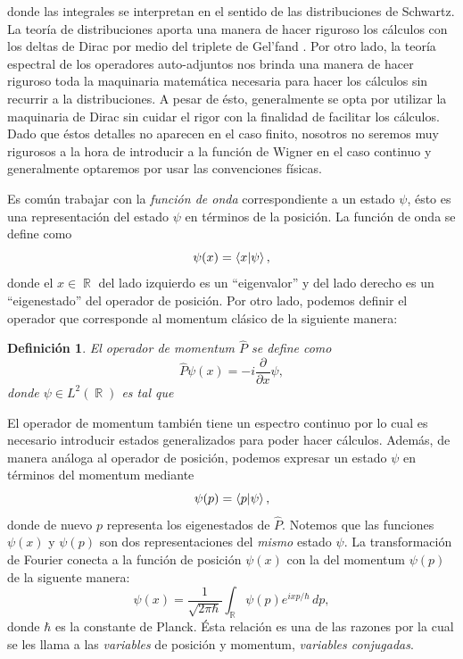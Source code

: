 \documentclass[a4paper,11pt]{report}
\DeclareMathOperator{\R}{\mathbb{R}}
\newtheorem{definition}{Definición}
\begin{document}
  donde las integrales se interpretan en el sentido de las
  distribuciones de Schwartz. La teoría de distribuciones
  aporta una manera de hacer riguroso los cálculos con los
  deltas de Dirac por medio del triplete de Gel'fand
  \cite{folland1989}. Por otro lado, la teoría espectral de
  los operadores auto-adjuntos nos brinda una manera de
  hacer riguroso toda la maquinaria matemática necesaria
  para hacer los cálculos sin recurrir a la distribuciones.
  A pesar de ésto, generalmente se opta por utilizar la
  maquinaria de Dirac sin cuidar el rigor con la finalidad
  de facilitar los cálculos. Dado que éstos detalles no
  aparecen en el caso finito, nosotros no seremos muy
  rigurosos a la hora de introducir a la función de Wigner
  en el caso continuo y generalmente optaremos por usar las
  convenciones físicas.

  Es común trabajar con la \textit{función de onda}
  correspondiente a un estado $\psi$, ésto es una
  representación del estado $\psi$ en términos de la
  posición. La función de onda se define como
  \begin{equation}
    \psi(x)
    = \braket{x| \psi},
  \end{equation} 
  donde el $x \in \R$ del lado izquierdo es un
  ``eigenvalor'' y del lado derecho es un ``eigenestado''
  del operador de posición. Por otro lado, podemos definir
  el operador que corresponde al momentum clásico de la
  siguiente manera:
  \begin{definition}
    El operador de momentum $\hat P$ se define como
    \[
      \hat P\psi(x) = -i \frac{\partial}{\partial x} \psi,
    \] 
    donde $\psi \in L^2(\R)$ es tal que
  \end{definition}
  El operador de momentum también tiene un espectro continuo
  por lo cual es necesario introducir estados generalizados
  para poder hacer cálculos. Además, de manera análoga al
  operador de posición, podemos expresar un estado $\psi$ en
  términos del momentum mediante
  \begin{equation}
    \psi(p)
    = \braket{p| \psi},
  \end{equation} 
  donde de nuevo $p$ representa los eigenestados de $\hat
  P$. Notemos que las funciones $\psi(x)$ y $\psi(p)$ son
  dos representaciones del \textit{mismo} estado $\psi$.  La
  transformación de Fourier conecta a la función de posición
  $\psi(x)$ con la del momentum $\psi(p)$ de la siguente
  manera:
  \begin{equation}
    \psi(x)
    = \frac{1}{\sqrt{2\pi\hbar}} \int_{\R} \psi(p)e^{ixp /
    \hbar} \, dp,
  \end{equation} 
  donde $\hbar$ es la constante de Planck. Ésta relación es
  una de las razones por la cual se les llama a las
  \textit{variables} de posición y momentum,
  \textit{variables conjugadas}.
\end{document}
